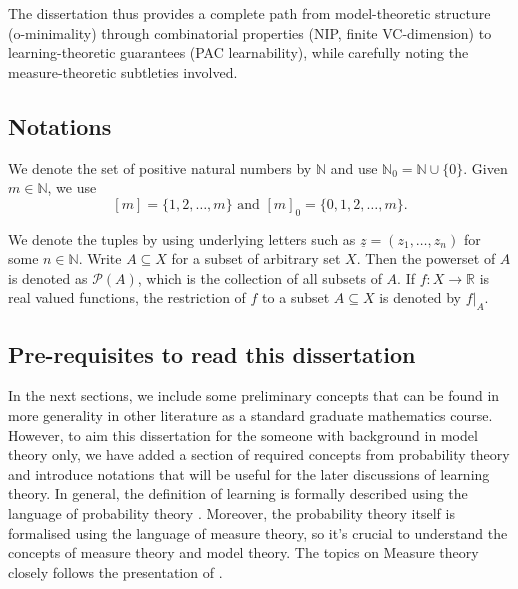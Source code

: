 The dissertation thus provides a complete path from model-theoretic structure (o-minimality) through combinatorial properties (NIP, finite VC-dimension) to learning-theoretic guarantees (PAC learnability), while carefully noting the measure-theoretic subtleties involved.

\subsection{Notations}\label{subsec:notations}

We denote the set of positive natural numbers by $\mathbb{N}$ and use $\mathbb{N}_0 =\mathbb{N} \cup \{0\}$. Given $m \in \mathbb{N}$, we use
\[
    [m] = \{1, 2, \ldots, m\} \textrm{ and }  [m]_0 = \{0, 1, 2, \ldots, m\}.
\]

\noindent
We denote the tuples by using underlying letters such as $\underline{z} = (z_1, \dots, z_n)$ for some $n \in \mathbb{N}$. Write $A \subseteq X$ for a subset of arbitrary set $X$. Then the powerset of  $A$ is denoted as $\mathcal{P}(A)$, which is the collection of all subsets of $A$. If $f : X \to \mathbb{R}$ is real valued functions, the restriction of $f$ to a subset $A \subseteq X$ is denoted by $f|_A$.

\subsection{Pre-requisites to read this dissertation}

In the next sections, we include some preliminary concepts that can be found in more generality in other literature as a standard graduate mathematics course. However, to aim this dissertation for the someone with background in model theory only, we have added a section of required concepts from probability theory and introduce notations that will be useful for the later discussions of learning theory. In general, the definition of learning is formally described using the language of probability theory \cite[Chap 2]{MartinAnthony}. Moreover, the probability theory itself is formalised using the language of measure theory, so it's crucial to understand the concepts of measure theory and model theory. The topics on Measure theory closely follows the presentation of \cite{MeasureTheoryLeGall}.



